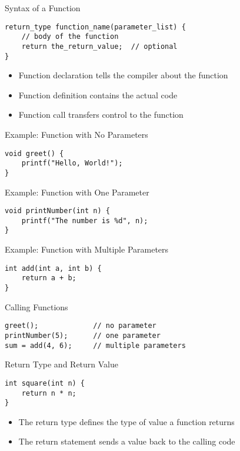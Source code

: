 \documentclass[12pt, aspectratio=169]{beamer}
\begin{document}
    \begin{frame}[fragile]{Syntax of a Function}
    \begin{verbatim}
return_type function_name(parameter_list) {
    // body of the function
    return the_return_value;  // optional
}
    \end{verbatim}

    \begin{itemize}
        \item Function declaration tells the compiler about the function
        \item Function definition contains the actual code
        \item Function call transfers control to the function
    \end{itemize}
    \end{frame}


    \begin{frame}[fragile]{Example: Function with No Parameters}
        \begin{verbatim}
void greet() {
    printf("Hello, World!");
}
        \end{verbatim}
    \end{frame}


    \begin{frame}[fragile]{Example: Function with One Parameter}
    \begin{verbatim}
void printNumber(int n) {
    printf("The number is %d", n);
}
\end{verbatim}
    \end{frame}


    \begin{frame}[fragile]{Example: Function with Multiple Parameters}
        \begin{verbatim}
int add(int a, int b) {
    return a + b;
}
        \end{verbatim}
    \end{frame}


    \begin{frame}[fragile]{Calling Functions}
        \begin{verbatim}
greet();             // no parameter
printNumber(5);      // one parameter
sum = add(4, 6);     // multiple parameters
        \end{verbatim}
    \end{frame}


    \begin{frame}[fragile]{Return Type and Return Value}
        \begin{verbatim}
int square(int n) {
    return n * n;
}
        \end{verbatim}


    \begin{itemize}
        \item The return type defines the type of value a function returns
        \item The return statement sends a value back to the calling code
    \end{itemize}
    \end{frame}
\end{document}
